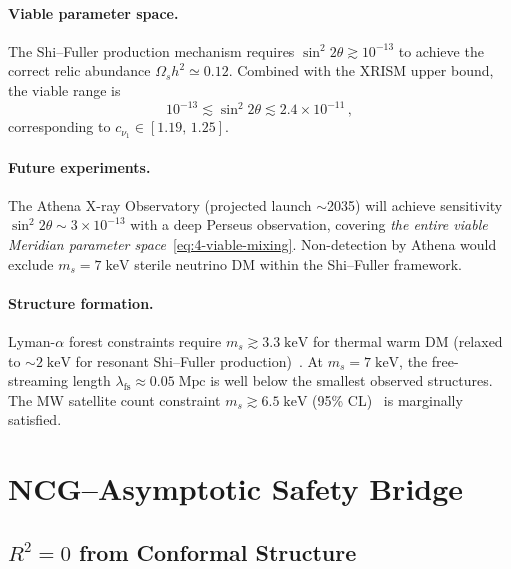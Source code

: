 \paragraph{Viable parameter space.} The Shi--Fuller production mechanism requires $\sin^2 2\theta \gtrsim 10^{-13}$ to achieve the correct relic abundance $\Omega_s h^2 \simeq 0.12$. Combined with the XRISM upper bound, the viable range is
\begin{equation}
  10^{-13} \lesssim \sin^2 2\theta \lesssim 2.4 \times 10^{-11}\,,
  \label{eq:4-viable-mixing}
\end{equation}
corresponding to $c_{\nu_1} \in [1.19,\, 1.25]$.

\paragraph{Future experiments.} The Athena X-ray Observatory (projected launch $\sim$2035) will achieve sensitivity $\sin^2 2\theta \sim 3 \times 10^{-13}$ with a deep Perseus observation, covering \emph{the entire viable Meridian parameter space}~\eqref{eq:4-viable-mixing}. Non-detection by Athena would exclude $m_s = 7\;\mathrm{keV}$ sterile neutrino DM within the Shi--Fuller framework.

\paragraph{Structure formation.} Lyman-$\alpha$ forest constraints require $m_s \gtrsim 3.3\;\mathrm{keV}$ for thermal warm DM (relaxed to $\sim 2\;\mathrm{keV}$ for resonant Shi--Fuller production)~\cite{ch4:Viel2013}. At $m_s = 7\;\mathrm{keV}$, the free-streaming length $\lambda_{\mathrm{fs}} \approx 0.05\;\mathrm{Mpc}$ is well below the smallest observed structures. The MW satellite count constraint $m_s \gtrsim 6.5\;\mathrm{keV}$ (95\% CL)~\cite{ch4:Nadler2021} is marginally satisfied.


\section{NCG--Asymptotic Safety Bridge}
\label{sec:4-ncg-as}

\subsection{$R^2 = 0$ from Conformal Structure}
\label{sec:4-r2-zero}

